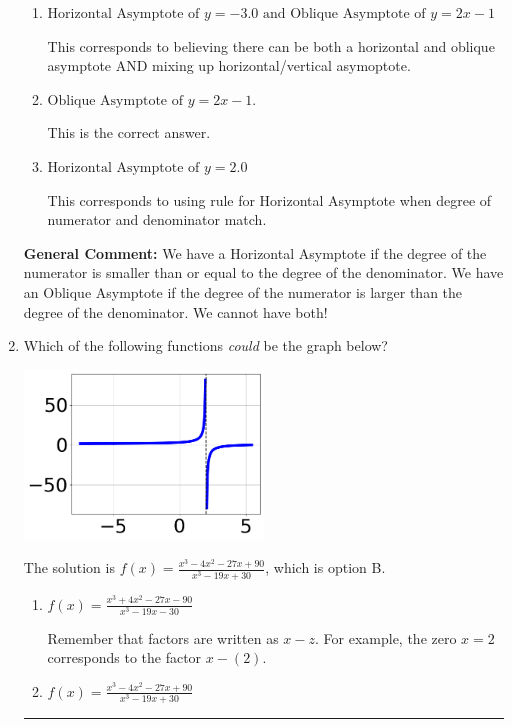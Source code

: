 \documentclass{extbook}[14pt]
\newcommand{\litem}[1]{\item #1

\rule{\textwidth}{0.4pt}}
\begin{document}
\begin{enumerate}
{\begin{enumerate}[label=\Alph*.]
This corresponds to considering where the denominator is equal to 0 as horizontal asymptote.
\item \( \text{Horizontal Asymptote of } y = -3.0 \text{ and Oblique Asymptote of } y = 2x -1 \)

This corresponds to believing there can be both a horizontal and oblique asymptote AND mixing up horizontal/vertical asymoptote.
\item \( \text{Oblique Asymptote of } y = 2x -1. \)

This is the correct answer.
\item \( \text{Horizontal Asymptote of } y = 2.0  \)

This corresponds to using rule for Horizontal Asymptote when degree of numerator and denominator match.
\end{enumerate}

\textbf{General Comment:} We have a Horizontal Asymptote if the degree of the numerator is smaller than or equal to the degree of the denominator. We have an Oblique Asymptote if the degree of the numerator is larger than the degree of the denominator. We cannot have both!
}
\litem{
Which of the following functions \textit{could} be the graph below?

\begin{center}
    \includegraphics[width=0.5\textwidth]{../Figures/identifyGraphOfRationalFunctionA.png}
\end{center}




The solution is \( f(x)=\frac{x^{3} -4 x^{2} -27 x + 90}{x^{3} -19 x + 30} \), which is option B.\begin{enumerate}[label=\Alph*.]
\item \( f(x)=\frac{x^{3} +4 x^{2} -27 x -90}{x^{3} -19 x -30} \)

Remember that factors are written as $x-z$. For example, the zero $x=2$ corresponds to the factor $x-(2)$.
\item \( f(x)=\frac{x^{3} -4 x^{2} -27 x + 90}{x^{3} -19 x + 30} \)


\end{enumerate}}
\end{enumerate}
\end{document}
